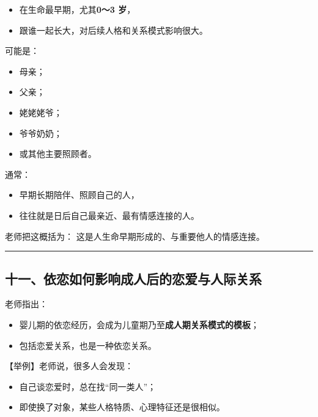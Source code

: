 \documentclass[
  chinese,
  9pt,
  a4paper,
]{ctexart}
\providecommand{\tightlist}{%
  \setlength{\itemsep}{0pt}\setlength{\parskip}{0pt}}
\begin{document}
\begin{itemize}
\tightlist
\item
  在生命最早期，尤其\textbf{0～3 岁}，
\item
  跟谁一起长大，对后续人格和关系模式影响很大。
\end{itemize}

可能是：

\begin{itemize}
\tightlist
\item
  母亲；
\item
  父亲；
\item
  姥姥姥爷；
\item
  爷爷奶奶；
\item
  或其他主要照顾者。
\end{itemize}

通常：

\begin{itemize}
\tightlist
\item
  早期长期陪伴、照顾自己的人，
\item
  往往就是日后自己最亲近、最有情感连接的人。
\end{itemize}

老师把这概括为： 这是人生命早期形成的、与重要他人的情感连接。

\begin{center}\rule{0.5\linewidth}{0.5pt}\end{center}

\subsection{十一、依恋如何影响成人后的恋爱与人际关系}\label{ux5341ux4e00ux4f9dux604bux5982ux4f55ux5f71ux54cdux6210ux4ebaux540eux7684ux604bux7231ux4e0eux4ebaux9645ux5173ux7cfb}

老师指出：

\begin{itemize}
\tightlist
\item
  婴儿期的依恋经历，会成为儿童期乃至\textbf{成人期关系模式的模板}；
\item
  包括恋爱关系，也是一种依恋关系。
\end{itemize}

【举例】老师说，很多人会发现：

\begin{itemize}
\tightlist
\item
  自己谈恋爱时，总在找``同一类人''；
\item
  即使换了对象，某些人格特质、心理特征还是很相似。
\end{itemize}
\end{document}
